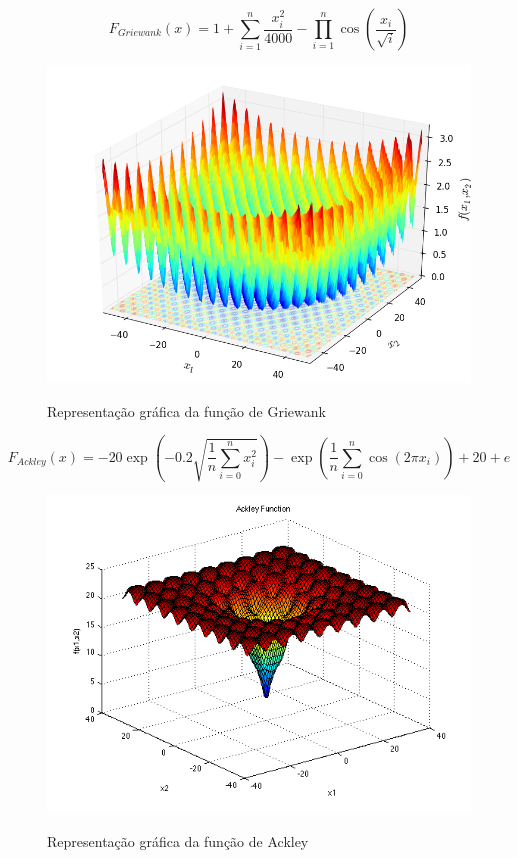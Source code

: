 \begin{equation}
\label{eq:griewank}
F_{Griewank}(x) = 1+ \sum_{i=1}^{n} \frac{x_i^2}{4000} - \prod_{i=1}^{n} \cos \left(\frac{x_i}{\sqrt{i}}\right)
\end{equation}

\begin{figure}[!htb]
	\caption{Representação gráfica da função de Griewank}
	\centering
	\includegraphics[scale=0.3]{images/f_griewank.png}
	\label{fig:f_griewank}
\end{figure}

\begin{equation}
\label{eq:ackley}
F_{Ackley}(x) = -20 \exp \left(-0.2 \sqrt{\frac{1}{n} \sum_{i=0}^{n} x_i^2 }\right) - \exp \left(\frac{1}{n} \sum_{i=0}^{n} \cos(2 \pi x_i) \right) + 20 + e
\end{equation}

\begin{figure}[!htb]
	\caption{Representação gráfica da função de Ackley}
	\centering
	\includegraphics[scale=0.3]{images/f_ackley.png}
	\label{fig:f_ackley}
\end{figure}

